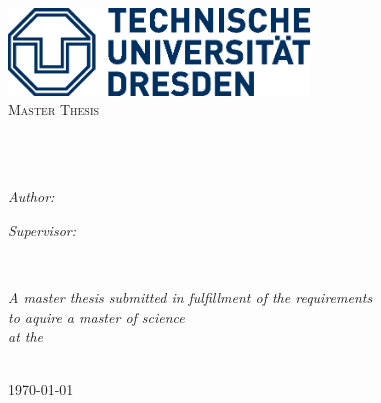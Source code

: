 \documentclass[
11pt, %
oneside, %
english, %
onehalfspacing, %
nolistspacing, %
liststotoc, %
parskip, %
headsepline, %
chapterinoneline, %
]{MastersThesis} %
\author{Niklas \textsc{Paulig}} %
\begin{document}
\frontmatter %

\pagestyle{plain} %


\begin{titlepage}
\begin{center}

\includegraphics[width=0.6\textwidth]{Figures/TU_Dresden_Logo_HKS41.eps}\vspace{1.5cm}\\ %
\textsc{\Large Master Thesis}\\[0.5cm]

\HRule \\[0.4cm] 
{\huge \bfseries \ttitle\par}\vspace{0.4cm}
\HRule \\[1.5cm] 
 
\begin{minipage}[t]{0.4\textwidth}
\begin{flushleft} \large
\emph{Author:}\\
{\authorname} 
\end{flushleft}
\end{minipage}
\begin{minipage}[t]{0.4\textwidth}
\begin{flushright} \large
\emph{Supervisor:} \\
\href{https://tu-dresden.de/bu/wirtschaft/vwl/oeko/die-professur/beschaeftigte-mitarbeiter-team}{\supname} %
\end{flushright}
\end{minipage}\\[2cm]
 
\vfill

\large \textit{A master thesis submitted in fulfillment of the requirements\\ to aquire a master of science}\\[0.3cm] %
\textit{at the}\\[0.4cm]
\deptname\\[1.5cm] %
 
\vfill

{\large \today}\\[1cm] %

 
\vfill
\end{center}
\end{titlepage}
\end{document}
